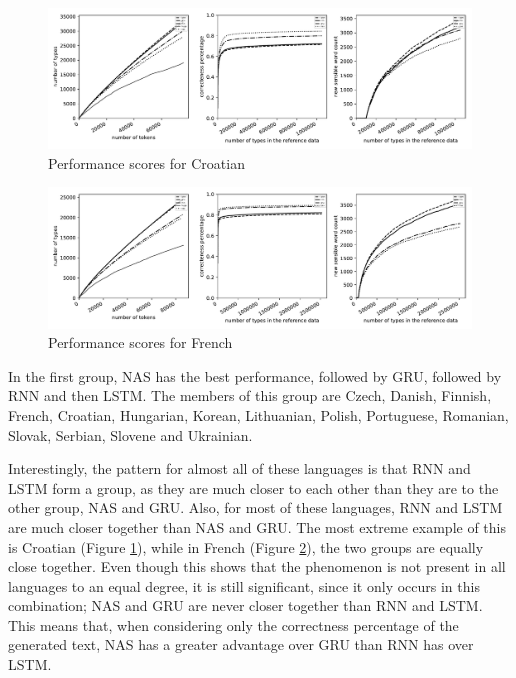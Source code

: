 \documentclass[11pt,a4paper,twoside,openright]{scrbook}
\begin{document}
\begin{figure}
\centering
\includegraphics[width=\textwidth]{graphs/hr_all_graphs}
\caption{Performance scores for Croatian}
\label{Figure:hr_all_graphs}
\end{figure}

\begin{figure}
\centering
\includegraphics[width=\textwidth]{graphs/fr_all_graphs}
\caption{Performance scores for French}
\label{Figure:fr_all_graphs}
\end{figure}

In the first group, NAS has the best performance, followed by GRU, followed by RNN and then LSTM. The members of this group are Czech, Danish, Finnish, French, Croatian, Hungarian, Korean, Lithuanian, Polish, Portuguese, Romanian, Slovak, Serbian, Slovene and Ukrainian. 

Interestingly, the pattern for almost all of these languages is that RNN and LSTM form a group, as they are much closer to each other than they are to the other  group, NAS and GRU. Also, for most of these languages, RNN and LSTM are much closer together than NAS and GRU. The most extreme example of this is Croatian (Figure \ref{Figure:hr_all_graphs}), while in French (Figure \ref{Figure:fr_all_graphs}), the two groups are equally close together. Even though this shows that the phenomenon is not present in all languages to an equal degree, it is still significant, since it only occurs in this combination; NAS and GRU are never closer together than RNN and LSTM. This means that, when considering only the correctness percentage of the generated text, NAS has a greater advantage over GRU than RNN has over LSTM. 
\end{document}

